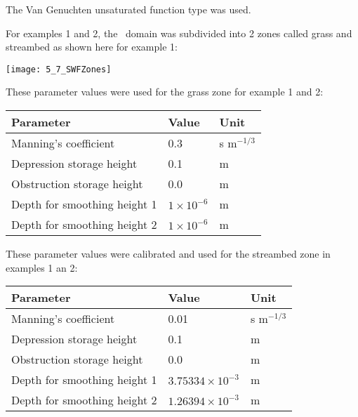 The Van Genuchten unsaturated function type was used.

For examples 1 and 2, the \swf\ domain was subdivided into 2 zones called grass and streambed as shown here for example 1:

\texttt{[image: 5\_7\_SWFZones]}

These parameter values were used for the grass zone for example 1 and 2:

\begin{center}
    \begin{tabular}{lll}  \hline
        Parameter                           & Value                         &   Unit            \\ \hline
        Manning's coefficient               &  0.3                          &   s m$^{-1/3}$   \\
        Depression storage height           &  0.1                          &   m               \\
        Obstruction storage height          &  0.0                          &   m               \\
        Depth for smoothing height 1        &  $1 \times 10^{-6}$     &   m               \\
        Depth for smoothing height 2        &  $1 \times 10^{-6}$     &   m               \\
    \hline
    \end{tabular}
\end{center}

These parameter values were calibrated and used for the streambed zone in examples 1 an 2:

\begin{center}
    \begin{tabular}{lll}  \hline
        Parameter                           & Value                         &   Unit            \\ \hline
        Manning's coefficient               &  0.01                         &   s m$^{-1/3}$   \\
        Depression storage height           &  0.1                          &   m               \\
        Obstruction storage height          &  0.0                          &   m               \\
        Depth for smoothing height 1        &  $3.75334 \times 10^{-3}$     &   m               \\
        Depth for smoothing height 2        &  $1.26394 \times 10^{-3}$     &   m               \\
    \hline
    \end{tabular}
\end{center}

